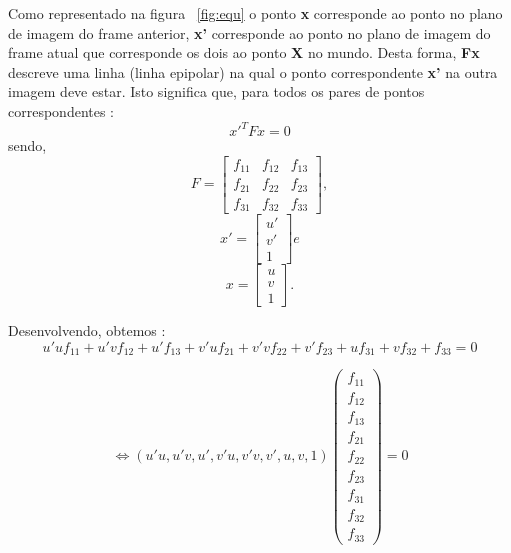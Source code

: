 	Como representado na figura ~\ref{fig:equ} o ponto \textbf{x} corresponde ao ponto no plano de imagem do frame anterior, \textbf{x'} corresponde ao ponto no plano de imagem do frame atual que corresponde os dois ao ponto \textbf{X} no mundo. Desta forma, \textbf{Fx} descreve uma linha (linha epipolar) na qual o ponto correspondente \textbf{x'} na outra imagem deve estar. Isto significa que, para todos os pares de pontos correspondentes : \[ {x}'^{T} F x = 0 \] 
	sendo, \[ F =  \left[ \begin{array}{ccc}
	f_{11} & f_{12} & f_{13} \\ 
	f_{21} & f_{22} & f_{23} \\ 
	f_{31} & f_{32} & f_{33} 
	\end{array}\right], \] \[ {x}' = \left[ \begin{array}{ccc}
	{u}' \\ {v}'\\ 1 
	\end{array} \right] e  \] \[ x = \left[ \begin{array}{ccc}
		u \\ v \\ 1  \end{array}\right]  . \]
		
	Desenvolvendo, obtemos : \[ u'uf_{11} + u'vf_{12} + u'f_{13} + v'uf_{21} + v'vf_{22} + v'f_{23} + uf_{31} + vf_{32} + f_{33} = 0 \]
	
	\[	\Leftrightarrow (u'u , u'v , u' , v'u , v'v , v' , u , v , 1) \left( \begin{array}{ccccccccc}
		f_{11}\\
		f_{12}\\
		f_{13}\\
		f_{21}\\
		f_{22}\\
		f_{23}\\
		f_{31}\\
		f_{32}\\
		f_{33}
		\end{array} \right) = 0 \] 
	
